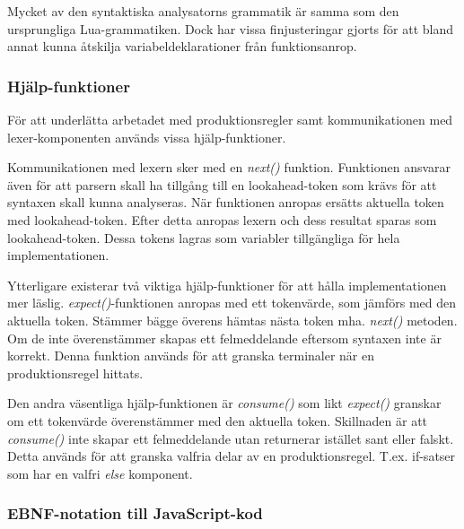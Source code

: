 Mycket av den syntaktiska analysatorns grammatik är samma som den ursprungliga
Lua-grammatiken. Dock har vissa finjusteringar gjorts för att bland annat
kunna åtskilja variabeldeklarationer från funktionsanrop.


\subsubsection{Hjälp-funktioner}

För att underlätta arbetadet med produktionsregler samt kommunikationen med
lexer-komponenten används vissa hjälp-funktioner.

Kommunikationen med lexern sker med en \textit{next()} funktion. Funktionen
ansvarar även för att parsern skall ha tillgång till en lookahead-token som
krävs för att syntaxen skall kunna analyseras. När funktionen anropas ersätts
aktuella token med lookahead-token. Efter detta anropas lexern och dess
resultat sparas som lookahead-token. Dessa tokens lagras som variabler
tillgängliga för hela implementationen.

Ytterligare existerar två viktiga hjälp-funktioner för att hålla
implementationen mer läslig. \textit{expect()}-funktionen anropas med ett
tokenvärde, som jämförs med den aktuella token. Stämmer bägge överens hämtas
nästa token mha. \textit{next()} metoden. Om de inte överenstämmer skapas ett
felmeddelande eftersom syntaxen inte är korrekt. Denna funktion används för
att granska terminaler när en produktionsregel hittats.

Den andra väsentliga hjälp-funktionen är \textit{consume()} som likt
\textit{expect()} granskar om ett tokenvärde överenstämmer med den aktuella
token. Skillnaden är att \textit{consume()} inte skapar ett felmeddelande utan
returnerar istället sant eller falskt. Detta används för att granska valfria
delar av en produktionsregel. T.ex. if-satser som har en valfri \textit{else}
komponent.

\subsubsection{EBNF-notation till JavaScript-kod}

